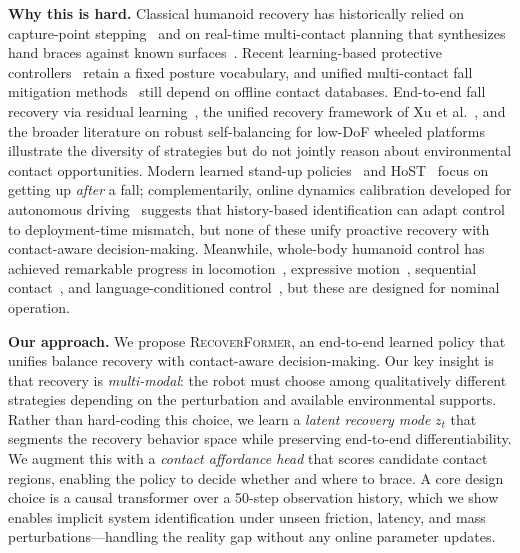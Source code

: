 \documentclass[conference,letterpaper]{IEEEtran}
\newcommand{\zt}{z_t}
\newcommand{\methodname}{\textsc{RecoverFormer}}
\begin{document}
\textbf{Why this is hard.}
Classical humanoid recovery has historically relied on capture-point stepping~\cite{pushrecovery2023} and on real-time multi-contact planning that synthesizes hand braces against known surfaces~\cite{wang2018realization}.
Recent learning-based protective controllers~\cite{safefall2025} retain a fixed posture vocabulary, and unified multi-contact fall mitigation methods~\cite{wang2018unified} still depend on offline contact databases.
End-to-end fall recovery via residual learning~\cite{frasa2025}, the unified recovery framework of Xu et al.~\cite{xu2025unified}, and the broader literature on robust self-balancing for low-DoF wheeled platforms~\cite{sharma2016bicycle} illustrate the diversity of strategies but do not jointly reason about environmental contact opportunities.
Modern learned stand-up policies~\cite{he2025getup} and HoST~\cite{host2025} focus on getting up \emph{after} a fall; complementarily, online dynamics calibration developed for autonomous driving~\cite{wang2023calibration} suggests that history-based identification can adapt control to deployment-time mismatch, but none of these unify proactive recovery with contact-aware decision-making.
Meanwhile, whole-body humanoid control has achieved remarkable progress in locomotion~\cite{radosavovic2024realworld,radosavovic2024humanoid}, expressive motion~\cite{cheng2024exbody,cheng2024exbody2}, sequential contact~\cite{zhang2024wococo}, and language-conditioned control~\cite{sentinel2025,shao2025langwbc}, but these are designed for nominal operation.

\textbf{Our approach.}
We propose \methodname{}, an end-to-end learned policy that unifies balance recovery with contact-aware decision-making.
Our key insight is that recovery is \emph{multi-modal}: the robot must choose among qualitatively different strategies depending on the perturbation and available environmental supports.
Rather than hard-coding this choice, we learn a \emph{latent recovery mode} $\zt$ that segments the recovery behavior space while preserving end-to-end differentiability.
We augment this with a \emph{contact affordance head} that scores candidate contact regions, enabling the policy to decide whether and where to brace.
A core design choice is a causal transformer over a 50-step observation history, which we show enables implicit system identification under unseen friction, latency, and mass perturbations---handling the reality gap without any online parameter updates.
\end{document}
